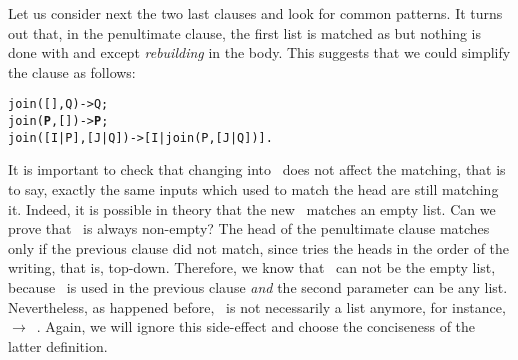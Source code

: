 Let us consider next the two last clauses and look for common
patterns. It turns out that, in the penultimate clause, the first list
is matched as \erlcode{[I|P]} but nothing is done with  and
 except \emph{rebuilding} \erlcode{[I|P]} in the body. This
suggests that we could simplify the clause as follows:
\begin{alltt}
join(   [],    Q) -> Q;
join(    \textbf{P},   []) -> \textbf{P};\hfill% P \emph{is a non-empty list}
join([I|P],[J|Q]) -> [I|join(P,[J|Q])].
\end{alltt}
It is important to check that changing \erlcode{[I|P]}
into~ does not affect the matching, that is to say, exactly
the same inputs which used to match the head are still matching
it. Indeed, it is possible in theory that the new~ matches
an empty list. Can we prove that ~is always non\hyp{}empty?
The head of the penultimate clause matches only if the previous clause
did not match, since \Erlang tries the heads in the order of the
writing, that is, top\hyp{}down. Therefore, we know that
~can not be the empty list, because \erlcode{[]}~is used in
the previous clause \emph{and} the second parameter can be any
list. Nevertheless, as happened before, ~is not necessarily
a list anymore, for instance, 
\(\rightarrow\)~. Again, we will ignore this
side\hyp{}effect and choose the conciseness of the latter definition.

